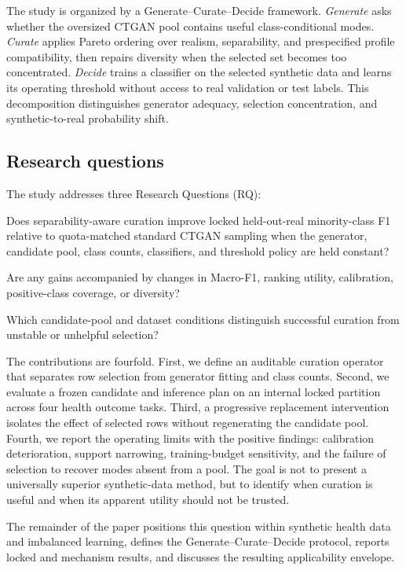 The study is organized by a Generate--Curate--Decide framework. \emph{Generate} asks whether the oversized CTGAN pool contains useful class-conditional modes. \emph{Curate} applies Pareto ordering over realism, separability, and prespecified profile compatibility, then repairs diversity when the selected set becomes too concentrated. \emph{Decide} trains a classifier on the selected synthetic data and learns its operating threshold without access to real validation or test labels. This decomposition distinguishes generator adequacy, selection concentration, and synthetic-to-real probability shift.

\subsection{Research questions}

The study addresses three Research Questions (RQ):
\begin{description}[leftmargin=1.2cm,style=nextline]
\item[\textbf{RQ1:}] Does separability-aware curation improve locked held-out-real minority-class F1 relative to quota-matched standard CTGAN sampling when the generator, candidate pool, class counts, classifiers, and threshold policy are held constant?
\item[\textbf{RQ2:}] Are any gains accompanied by changes in Macro-F1, ranking utility, calibration, positive-class coverage, or diversity?
\item[\textbf{RQ3:}] Which candidate-pool and dataset conditions distinguish successful curation from unstable or unhelpful selection?
\end{description}

The contributions are fourfold. First, we define an auditable curation operator that separates row selection from generator fitting and class counts. Second, we evaluate a frozen candidate and inference plan on an internal locked partition across four health outcome tasks. Third, a progressive replacement intervention isolates the effect of selected rows without regenerating the candidate pool. Fourth, we report the operating limits with the positive findings: calibration deterioration, support narrowing, training-budget sensitivity, and the failure of selection to recover modes absent from a pool. The goal is not to present a universally superior synthetic-data method, but to identify when curation is useful and when its apparent utility should not be trusted.

The remainder of the paper positions this question within synthetic health data and imbalanced learning, defines the Generate--Curate--Decide protocol, reports locked and mechanism results, and discusses the resulting applicability envelope.
